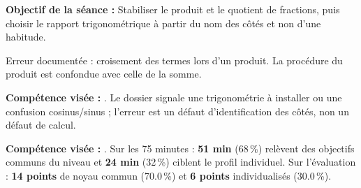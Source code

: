 \documentclass[10pt,a4paper]{article}
\begin{document}
\begin{goalbox}\textbf{Objectif de la séance :} Stabiliser le produit et le quotient de fractions, puis choisir le rapport trigonométrique à partir du nom des côtés et non d'une habitude.\end{goalbox}
Erreur documentée : croisement des termes lors d'un produit. La procédure du produit est confondue avec celle de la somme.
\par\vspace{1mm}\textbf{Compétence visée :} .
Le dossier signale une trigonométrie à installer ou une confusion cosinus/sinus ; l'erreur est un défaut d'identification des côtés, non un défaut de calcul.
\par\vspace{1mm}\textbf{Compétence visée :} .
Sur les 75 minutes : \textbf{51 min} (68\,\%) relèvent des objectifs communs du niveau et \textbf{24 min} (32\,\%) ciblent le profil individuel. Sur l'évaluation : \textbf{14 points} de noyau commun (70.0\,\%) et \textbf{6 points} individualisés (30.0\,\%).
\newpage{}
\end{document}
